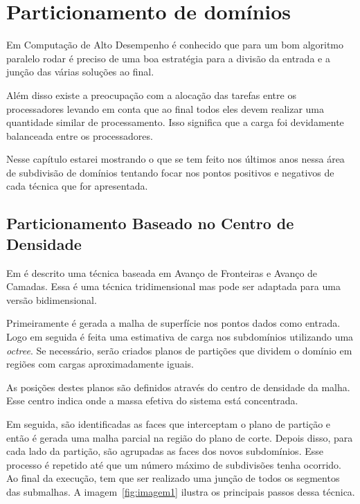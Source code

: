 \pagestyle{empty}
\cleardoublepage
\pagestyle{fancy}
\chapter{Particionamento de domínios}\label{cap2}

Em Computação de Alto Desempenho é conhecido que para um bom algoritmo paralelo rodar é preciso de uma boa estratégia para a divisão da entrada e a junção das várias soluções ao final. 

Além disso existe a preocupação com a alocação das tarefas entre os processadores levando em conta que ao final todos eles devem realizar uma quantidade similar de processamento. Isso significa que a carga foi devidamente balanceada entre os processadores.

Nesse capítulo estarei mostrando o que se tem feito nos últimos anos nessa área de subdivisão de domínios tentando focar nos pontos positivos e negativos de cada técnica que for apresentada.


\section{Particionamento Baseado no Centro de Densidade}

Em \cite{bib:Pirzadeh09} é descrito uma técnica baseada em Avanço de Fronteiras e Avanço de Camadas. Essa é uma técnica tridimensional mas pode ser adaptada para uma versão bidimensional.

Primeiramente é gerada a malha de superfície nos pontos dados como entrada. Logo em seguida é feita uma estimativa de carga nos subdomínios utilizando uma \textit{octree}. Se necessário, serão criados planos de partições que dividem o domínio em regiões com cargas aproximadamente iguais. 

As posições destes planos são definidos através do centro de densidade da malha. Esse centro indica onde a massa efetiva do sistema está concentrada.

Em seguida, são identificadas as faces que interceptam o plano de partição e então é gerada uma malha parcial na região do plano de corte. Depois disso, para cada lado da partição, são agrupadas as faces dos novos subdomínios. Esse processo é repetido até que um número máximo de subdivisões tenha ocorrido. Ao final da execução, tem que ser realizado uma junção de todos os segmentos das submalhas. A imagem~\ref{fig:imagem1} ilustra os principais passos dessa técnica.

